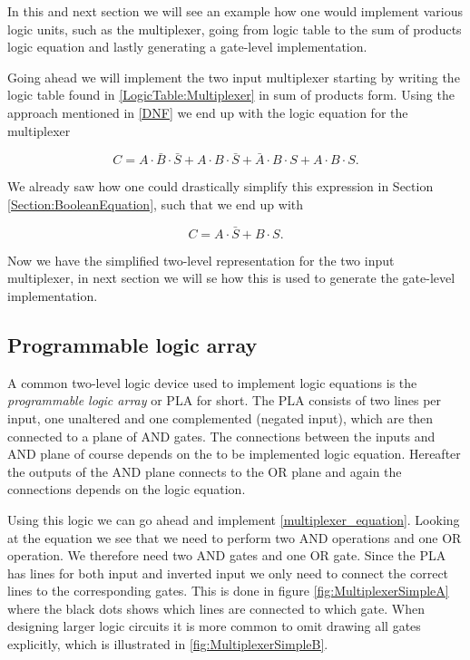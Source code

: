             In this and next section we will see an example how one would implement various logic units, such as the multiplexer, going from logic table to the sum of products logic equation and lastly generating a gate-level implementation.
            
            Going ahead we will implement the two input multiplexer starting by writing the logic table found in \ref{LogicTable:Multiplexer} in sum of products form. Using the approach mentioned in \ref{DNF} we end up with the logic equation for the multiplexer 
            
            \begin{equation}
                C = A \cdot \bar{B} \cdot \bar{S} + A \cdot B \cdot \bar{S} + \bar{A} \cdot B \cdot S
                    + A \cdot B \cdot S.
            \end{equation}
             
            We already saw how one could drastically simplify this expression in Section \ref{Section:BooleanEquation}, such that we end up with
            
            \begin{equation}
                \label{multiplexer_equation}
                C = A\cdot \bar{S} + B\cdot S.
            \end{equation}
            
            Now we have the simplified two-level representation for the two input multiplexer, in next section we will se how this is used to generate the gate-level implementation.
        
        \subsection{Programmable logic array}
        
            A common two-level logic device used to implement logic equations is the \textit{programmable logic array} or PLA for short. The PLA consists of two lines per input, one unaltered and one complemented (negated input), which are then connected to a plane of AND gates. The connections between the inputs and AND plane of course depends on the to be implemented logic equation. Hereafter the outputs of the AND plane connects to the OR plane and again the connections depends on the logic equation.
            
            Using this logic we can go ahead and implement \ref{multiplexer_equation}. Looking at the equation we see that we need to perform two AND operations and one OR operation. We therefore need two AND gates and one OR gate. Since the PLA has lines for both input and inverted input we only need to connect the correct lines to the corresponding gates. This is done in figure \ref{fig:MultiplexerSimpleA} where the black dots shows which lines are connected to which gate. When designing larger logic circuits it is more common to omit drawing all gates explicitly, which is illustrated in \ref{fig:MultiplexerSimpleB}. 
        
